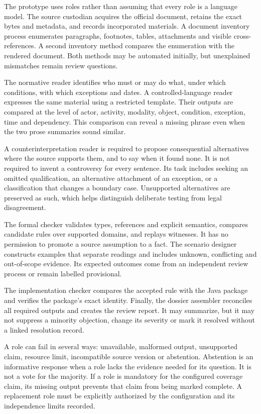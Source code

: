 The prototype uses roles rather than assuming that every role is a language
model. The source custodian acquires the official document, retains the exact
bytes and metadata, and records incorporated materials. A document inventory
process enumerates paragraphs, footnotes, tables, attachments and visible
cross-references. A second inventory method compares the enumeration with the
rendered document. Both methods may be automated initially, but unexplained
mismatches remain review questions.

The normative reader identifies who must or may do what, under which conditions,
with which exceptions and dates. A controlled-language reader expresses the same
material using a restricted template. Their outputs are compared at the level
of actor, activity, modality, object, condition, exception, time and dependency.
This comparison can reveal a missing phrase even when the two prose summaries
sound similar.

A counterinterpretation reader is required to propose consequential alternatives
where the source supports them, and to say when it found none. It is not required
to invent a controversy for every sentence. Its task includes seeking an omitted
qualification, an alternative attachment of an exception, or a classification
that changes a boundary case. Unsupported alternatives are preserved as such,
which helps distinguish deliberate testing from legal disagreement.

The formal checker validates types, references and explicit semantics, compares
candidate rules over supported domains, and replays witnesses. It has no
permission to promote a source assumption to a fact. The scenario designer
constructs examples that separate readings and includes unknown, conflicting and
out-of-scope evidence. Its expected outcomes come from an independent review
process or remain labelled provisional.


The implementation checker compares the accepted rule with the Java package and
verifies the package's exact identity. Finally, the dossier assembler reconciles
all required outputs and creates the review report. It may summarize, but it may
not suppress a minority objection, change its severity or mark it resolved without
a linked resolution record.

A role can fail in several ways: unavailable, malformed output, unsupported
claim, resource limit, incompatible source version or abstention. Abstention is
an informative response when a role lacks the evidence needed for its question.
It is not a vote for the majority. If a role is mandatory for the configured
coverage claim, its missing output prevents that claim from being marked complete.
A replacement role must be explicitly authorized by the configuration and its
independence limits recorded.

